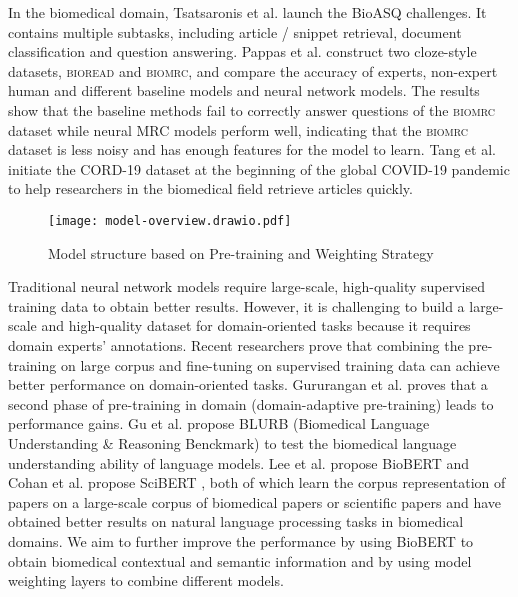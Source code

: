 \documentclass[sigconf, screen]{acmart}
\newcommand{\biomrc}{{\scshape{biomrc}}\xspace}
\newcommand{\biobert}{Bio\-BERT\xspace}
\begin{document}
In the biomedical domain, Tsatsaronis et al. launch the BioASQ \cite{tsatsaronisOverviewBIOASQLargescale2015} challenges. It contains multiple subtasks, including article / snippet retrieval, document classification and question answering. Pappas et al. construct two cloze-style datasets, { \scshape bioread}\cite{pappasBioReadNewDataset2018} and \biomrc \cite{pappasBioMRCDatasetBiomedical2020}, and compare the accuracy of experts, non-expert human and different baseline models and neural network models. The results show that the baseline methods fail to correctly answer questions of the \biomrc dataset while neural MRC models perform well, indicating that the \biomrc dataset is less noisy and has enough features for the model to learn. Tang et al. initiate the CORD-19 \cite{tangRapidlyBootstrappingQuestion2020} dataset at the beginning of the global COVID-19 pandemic to help researchers in the biomedical field retrieve articles quickly.

\begin{figure*}[t]
    \centering
    \texttt{[image: model-overview.drawio.pdf]}
    \caption{Model structure based on Pre-training and Weighting Strategy}
    \label{fig:overview}
\end{figure*}

Traditional neural network models require large-scale, high-quality supervised training data to obtain better results. However, it is challenging to build a large-scale and high-quality dataset for domain-oriented tasks because it requires domain experts' annotations. Recent researchers prove that combining the pre-training on large corpus and fine-tuning on supervised training data can achieve better performance on domain-oriented tasks. Gururangan et al. \cite{gururanganDonStopPretraining2020a} proves that a second phase of pre-training in domain (domain-adaptive pre-training) leads to performance gains. Gu et al. propose BLURB (Biomedical Language Understanding \& Reasoning Benckmark) \cite{guDomainSpecificLanguageModel2021} to test the biomedical language understanding ability of language models. Lee et al. propose BioBERT \cite{leeBioBERTPretrainedBiomedical2019} and Cohan et al. propose SciBERT \cite{beltagySciBERTPretrainedLanguage2019}, both of which learn the corpus representation of papers on a large-scale corpus of biomedical papers or scientific papers and have obtained better results on natural language processing tasks in biomedical domains. We aim to further improve the performance by using \biobert to obtain biomedical contextual and semantic information and by using model weighting layers to combine different models.
\end{document}
